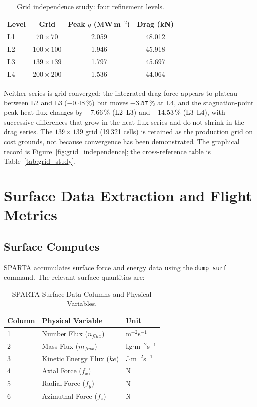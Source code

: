 \begin{table}[H]
    \centering
    \caption{Grid independence study: four refinement levels.}
    \label{tab:mesh_independence}
    \begin{tabular}{|l|c|c|c|}
        \hline
        \textbf{Level} & \textbf{Grid} & \textbf{Peak $\dot q$ (MW\,m$^{-2}$)} & \textbf{Drag (kN)} \\ \hline
        L1 & $70\times70$ & 2.059 & 48.012 \\ \hline
        L2 & $100\times100$ & 1.946 & 45.918 \\ \hline
        L3 & $139\times139$ & 1.797 & 45.697 \\ \hline
        L4 & $200\times200$ & 1.536 & 44.064 \\ \hline
    \end{tabular}
\end{table}

Neither series is grid-converged: the integrated drag force appears to plateau between L2 and L3 ($-0.48\,\%$) but moves $-3.57\,\%$ at L4, and the stagnation-point peak heat flux changes by $-7.66\,\%$ (L2--L3) and $-14.53\,\%$ (L3--L4), with successive differences that grow in the heat-flux series and do not shrink in the drag series. The $139\times139$ grid (19\,321 cells) is retained as the production grid on cost grounds, not because convergence has been demonstrated. The graphical record is Figure~\ref{fig:grid_independence}; the cross-reference table is Table~\ref{tab:grid_study}.

\section{Surface Data Extraction and Flight Metrics}

\subsection{Surface Computes}
SPARTA accumulates surface force and energy data using the \texttt{dump surf} command. The relevant surface quantities are:

\begin{table}[H]
    \centering
    \caption{SPARTA Surface Data Columns and Physical Variables.}
    \label{tab:surface_data}
    \begin{tabular}{|l|l|l|}
        \hline
        \textbf{Column} & \textbf{Physical Variable} & \textbf{Unit} \\ \hline
        1 & Number Flux ($n_{flux}$) & m$^{-2}$s$^{-1}$ \\ \hline
        2 & Mass Flux ($m_{flux}$) & kg$\cdot$m$^{-2}$s$^{-1}$ \\ \hline
        3 & Kinetic Energy Flux ($ke$) & J$\cdot$m$^{-2}$s$^{-1}$ \\ \hline
        4 & Axial Force ($f_x$) & N \\ \hline
        5 & Radial Force ($f_y$) & N \\ \hline
        6 & Azimuthal Force ($f_z$) & N \\ \hline
    \end{tabular}
\end{table}

